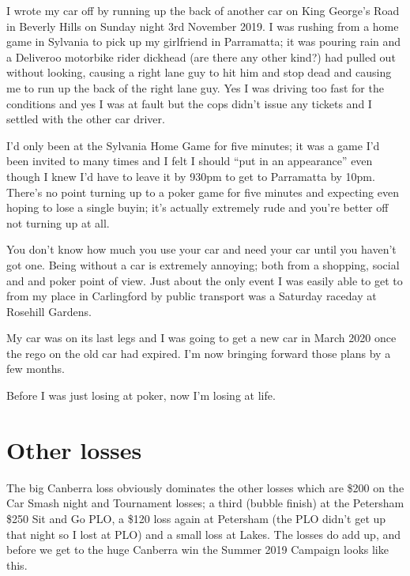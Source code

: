 I wrote my car off by running up the back of another car on King
George's Road in Beverly Hills on Sunday night 3rd November 2019.
I was rushing from a home game in Sylvania to pick up my girlfriend in
Parramatta; it was pouring rain and a Deliveroo motorbike
rider dickhead (are there any other kind?) had pulled out without
looking, causing a right lane guy to hit him and stop dead and causing
me to run up the back of the right lane guy. Yes I was driving too
fast for the conditions and yes I was at fault but the cops didn't
issue any tickets and I settled with the other car driver.

I'd only been at the Sylvania Home Game for five minutes; it was a
game I'd been invited to many times and I felt I should ``put in an
appearance'' even though I knew I'd have to leave it by 930pm to get
to Parramatta by 10pm. There's no point turning up to a poker game for
five minutes and expecting even hoping to lose a single buyin; it's
actually extremely rude and you're better off not turning up at all.

You don't know how much you use your car and need your car until you
haven't got one. Being without a car is extremely annoying; both from
a shopping, social and and poker point of view. Just about the only
event I was easily able to get to from my place in Carlingford by
public transport was a Saturday raceday at Rosehill Gardens.

My car was on its last legs and I was going to get a new car in March
2020 once the rego on the old car had expired. I'm now bringing
forward those plans by a few months.

Before I was just losing at poker, now I'm losing at life.

\section*{Other losses}

The big Canberra loss obviously dominates the other losses which are
\$200 on the Car Smash night and Tournament losses; a third (bubble
finish) at the Petersham \$250 Sit and Go PLO, a \$120 loss again at
Petersham (the PLO didn't get up that night so I lost at PLO) and a
small loss at Lakes. The losses do add up, and before we get to
the huge Canberra win the Summer 2019 Campaign looks like this.

